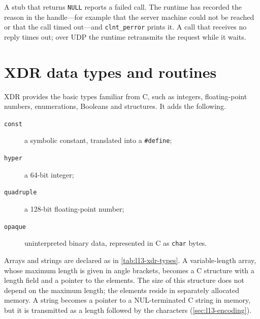 \documentclass[../main.tex]{subfiles}
\begin{document}
A stub that returns \texttt{NULL} reports a failed call.  The runtime has
recorded the reason in the handle---for example that the server machine
could not be reached or that the call timed out---and
\texttt{clnt\_perror} prints it.  A call that receives no reply times out;
over UDP the runtime retransmits the request while it waits.

\section{XDR data types and routines}
\label{sec:l13-xdr-types}

XDR provides the basic types familiar from C, such as integers,
floating-point numbers, enumerations, Booleans and
structures.  It adds the following.
\begin{description}
  \item[\texttt{const}] a symbolic constant, translated into a
    \texttt{\#define};
  \item[\texttt{hyper}] a 64-bit integer;
  \item[\texttt{quadruple}] a 128-bit floating-point number;
  \item[\texttt{opaque}] uninterpreted binary data, represented in C as
    \texttt{char} bytes.
\end{description}
Arrays and strings are declared as in \cref{tab:l13-xdr-types}.  A
variable-length array, whose maximum length is given in angle brackets,
becomes a C structure with a length field and a pointer to the
elements.
The size of this structure does not depend on the maximum length; the
elements reside in separately allocated memory.  A string becomes a
pointer to a NUL-terminated C string in memory, but it is transmitted as a
length followed by the characters (\cref{sec:l13-encoding}).
\end{document}
